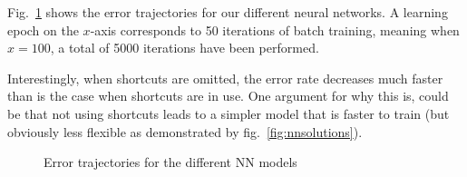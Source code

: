 \documentclass{article}
\begin{document}
Fig.~\ref{fig:nnerrors} shows the error trajectories for our different
neural networks. A learning epoch on the $x$-axis corresponds to 50
iterations of batch training, meaning when $x = 100$, a total of 5000
iterations have been performed.

Interestingly, when shortcuts are omitted, the error rate decreases
much faster than is the case when shortcuts are in use. One argument
for why this is, could be that not using shortcuts leads to a simpler
model that is faster to train (but obviously less flexible as
demonstrated by fig.~\ref{fig:nnsolutions}).

\begin{figure}[!h]
  \centering

  \caption{Error trajectories for the different NN models}
  \label{fig:nnerrors}
\end{figure}
\end{document}
